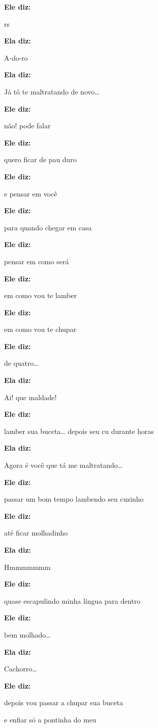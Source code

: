 \textbf{Ele diz:}

rs

\textbf{Ela diz:}

A-do-ro

\textbf{Ela diz:}

Já tô te maltratando de novo…

\textbf{Ele diz:}

não! pode falar

\textbf{Ele diz:}

quero ficar de pau duro

\textbf{Ele diz:}

e pensar em você

\textbf{Ele diz:}

para quando chegar em casa

\textbf{Ele diz:}

pensar em como será

\textbf{Ele diz:}

em como vou te lamber

\textbf{Ele diz:}

em como vou te chupar

\textbf{Ele diz:}

de quatro…

\textbf{Ela diz:}

Ai! que maldade!

\textbf{Ele diz:}

lamber sua buceta… depois seu cu durante horas

\textbf{Ela diz:}

Agora é você que tá me maltratando…

\textbf{Ele diz:}

passar um bom tempo lambendo seu cuzinho

\textbf{Ele diz:}

até ficar molhadinho

\textbf{Ela diz:}

Hmmmmmmm

\textbf{Ele diz:}

quase escapulindo minha língua para dentro

\textbf{Ele diz:}

bem molhado…

\textbf{Ela diz:}

Cachorro…

\textbf{Ele diz:}

depois vou passar a chupar sua buceta

e enfiar só a pontinha do meu

